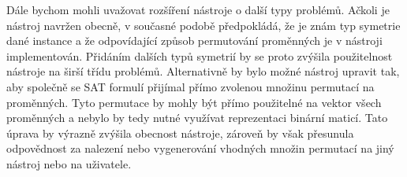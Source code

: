Dále bychom mohli uvažovat rozšíření nástroje o další typy problémů. Ačkoli je nástroj navržen obecně, v současné podobě předpokládá, že je znám typ
symetrie dané instance a že odpovídající způsob permutování proměnných je v nástroji implementován. Přidáním dalších typů symetrií by se proto zvýšila
použitelnost nástroje na širší třídu problémů. Alternativně by bylo možné nástroj upravit tak, aby společně se SAT formulí přijímal přímo zvolenou množinu permutací
na proměnných. Tyto permutace by mohly být přímo použitelné na vektor všech proměnných a nebylo by tedy nutné využívat reprezentaci binární maticí. Tato úprava by výrazně zvýšila obecnost nástroje, zároveň by však přesunula odpovědnost za nalezení nebo vygenerování vhodných množin permutací na jiný nástroj nebo na uživatele.
